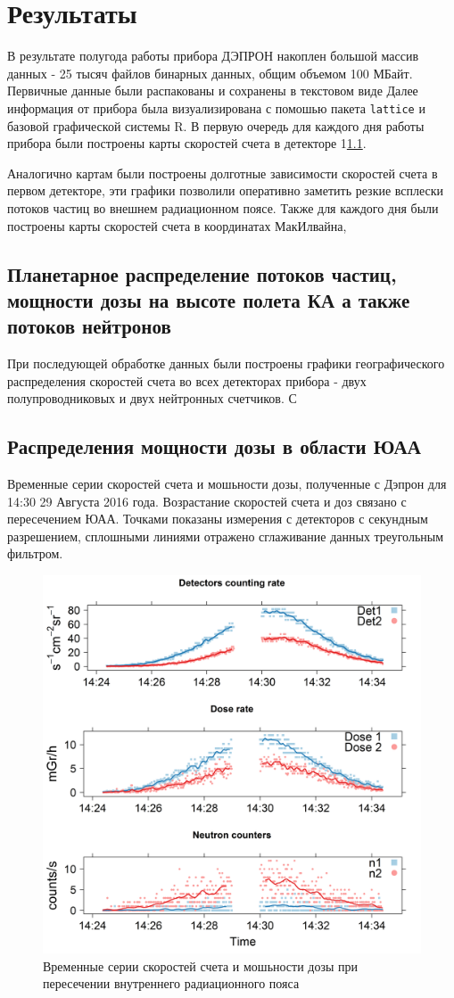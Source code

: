 
\chapter{Результаты}\label{chapt_results}
В результате полугода работы прибора ДЭПРОН накоплен большой массив данных - 25 тысяч файлов бинарных данных, общим объемом 100 МБайт. Первичные данные были распакованы и сохранены в текстовом виде 
Далее информация от прибора была визуализирована с помошью пакета \texttt{lattice} и базовой графической системы R. 
В первую очередь для каждого дня работы прибора были построены карты скоростей счета в детекторе 1\ref{sec:planetDose}.

Аналогично картам были построены долготные зависимости скоростей счета в первом детекторе, эти графики позволили оперативно заметить резкие всплески потоков частиц во внешнем радиационном поясе. Также для каждого дня были построены карты скоростей счета в координатах МакИлвайна, 

\section{Планетарное распределение потоков частиц, мощности дозы на высоте полета КА а также потоков нейтронов} \label{sec:planetDose}
При последующей обработке данных были построены графики географического распределения скоростей счета во всех детекторах прибора - двух полупроводниковых и двух нейтронных счетчиков. С 

\section{Распределения мощности дозы в области ЮАА}
Временные серии скоростей счета и мошьности дозы, полученные с Дэпрон для 14:30 29 Августа 2016 года. Возрастание скоростей счета и доз связано с пересечением ЮАА. Точками показаны измерения с детекторов с секундным разрешением, сплошными линиями отражено сглаживание данных треугольным фильтром.
\begin{figure}
	\centering
	\includegraphics[width=0.7\linewidth]{images/results/depron_sec_log_new08-29-1614-24-23}
	\caption{Временные серии скоростей счета и мошьности дозы при пересечении внутреннего радиационного пояса}	\label{fig:depronseclognew08-29-1614-24-23}
\end{figure}


